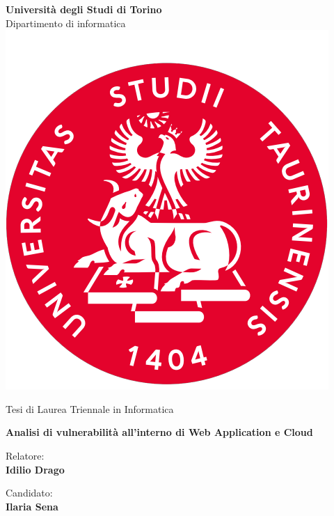 \begin{titlepage}

\begin{center}
    \textbf{\huge{Università degli Studi di Torino}}
    \vspace{2mm}
    \\ \LARGE{Dipartimento di informatica}
    \vspace{5mm}
    \\ \includegraphics[keepaspectratio=true,scale=0.4]{images/unito_logo.png}
    \vspace{5mm}
\end{center}

\begin{center}
    \LARGE{Tesi di Laurea Triennale in Informatica} 
\end{center}

\vspace{15mm}
\begin{center}
    \linespread{1.5}%
    \selectfont
    \textbf{\huge{ Analisi di vulnerabilità all’interno di Web
    Application e Cloud }}
\end{center}
\vspace{30mm}

\begin{minipage}[t]{0.47\textwidth}
	{\large{Relatore:}{\normalsize\vspace{3mm}
	\bf\\ \large{Idilio Drago} \normalsize\vspace{3mm}\bf}}
\end{minipage}
\hfill
\begin{minipage}[t]{0.47\textwidth}\raggedleft
	{\large{Candidato:}{\normalsize\vspace{3mm} \bf\\ \large{Ilaria Sena}}}
\end{minipage}

\vspace{40 mm}
\hrulefill
\\ 

\end{titlepage}